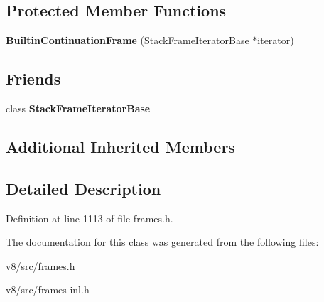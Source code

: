 \subsection*{Protected Member Functions}
\begin{DoxyCompactItemize}
\item 
\mbox{\label{classv8_1_1internal_1_1BuiltinContinuationFrame_a09876c8b568c8da8eaf5380fe80fb4ca}} 
{\bfseries Builtin\+Continuation\+Frame} (\mbox{\hyperlink{classv8_1_1internal_1_1StackFrameIteratorBase}{Stack\+Frame\+Iterator\+Base}} $\ast$iterator)
\end{DoxyCompactItemize}
\subsection*{Friends}
\begin{DoxyCompactItemize}
\item 
\mbox{\label{classv8_1_1internal_1_1BuiltinContinuationFrame_ac7310421866976ca454bbe11c5f926c3}} 
class {\bfseries Stack\+Frame\+Iterator\+Base}
\end{DoxyCompactItemize}
\subsection*{Additional Inherited Members}


\subsection{Detailed Description}


Definition at line 1113 of file frames.\+h.



The documentation for this class was generated from the following files\+:\begin{DoxyCompactItemize}
\item 
v8/src/frames.\+h\item 
v8/src/frames-\/inl.\+h\end{DoxyCompactItemize}
